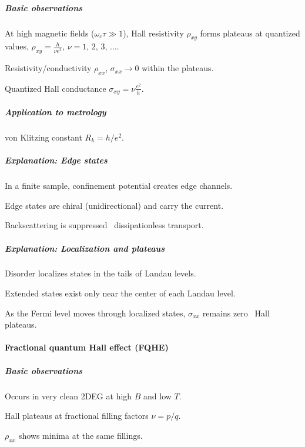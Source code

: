 \subparagraph{Basic observations}

\begin{enumext}
  \item At high magnetic fields ($\omega_c \tau \gg 1$), Hall
  resistivity $\rho_{xy}$ forms plateaus at quantized values,
  $\rho_{xy} = \frac{h}{\nu e^2}$,
  $\nu = 1$, $2$, $3$, $\ldots$.
  \item Resistivity/conductivity
  $\rho_{xx}$, $\sigma_{xx}\to 0$ within the plateaus.
  \item Quantized Hall conductance $\sigma_{xy} = \nu \frac{e^2}{h}$.
\end{enumext}

\subparagraph{Application to metrology}

von Klitzing constant $R_k = h/e^2$.

\subparagraph{Explanation: Edge states}

\begin{enumext}
  \item In a finite sample, confinement potential creates edge channels.
  \item Edge states are chiral (unidirectional) and carry the current.
  \item Backscattering is suppressed \textrightarrow\ dissipationless transport.
\end{enumext}

\subparagraph{Explanation: Localization and plateaus}

\begin{enumext}
  \item Disorder localizes states in the tails of Landau levels.
  \item Extended states exist only near the center of each Landau level.
  \item As the Fermi level moves through localized states, $\sigma_{xx}$
  remains zero \textrightarrow\ Hall plateaus.
\end{enumext}

\paragraph{Fractional quantum Hall effect (FQHE)}

\subparagraph{Basic observations}

\begin{enumext}
  \item Occurs in very clean 2DEG at high $B$ and low $T$.
  \item Hall plateaus at fractional filling factors $\nu = p/q$.
  \item $\rho_{xx}$ shows minima at the same fillings.
\end{enumext}

